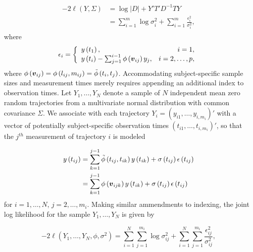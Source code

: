 \begin{align}
\begin{split} \label{eq:loglik-cholesky-form}
-2\ell\left( Y, \Sigma \right) &= \log \vert D \vert + Y' T' D^{-1} T Y \\
&= \sum_{i = 1}^m \log \sigma_i^2  + \sum_{i = 1}^m \frac {\epsilon_i^2}{\sigma_i^2},
\end{split}
\end{align}
\noindent
where 
\begin{equation} \label{eq:loglik-cholesky-form}
\epsilon_i = \left\{\begin{array}{lr}y\left(t_1\right), & i = 1, \\
y\left(t_i\right) - \sum_{j = 1}^{i-1} \phi\left(\mbox{\boldmath $v$}_{ij}\right) y_j, & i= 2, \dots, p, \\
\end{array} \right.
\end{equation}
\noindent
where $\phi\left(\mbox{\boldmath $v$}_{ij}\right) = \phi\left(l_{ij},m_{ij}\right) = \tilde{\phi}\left(t_i,t_j\right)$.  Accommodating subject-specific sample sizes and measurement times merely requires appending an additional index to observation times. Let  $Y_1, \dots, Y_N$ denote a sample of $N$ independent mean zero random trajectories from a  multivariate normal distribution with common covariance $\Sigma$. We associate with each trajectory $Y_i = \left(y_{i1}, \dots, y_{i,m_i}\right)'$ with a vector of potentially subject-specific observation times $\left(t_{i1}, \dots, t_{i,m_i}\right)'$, so that the $j^{th}$ measurement of trajectory $i$ is modeled

\begin{align}
\begin{split} \label{eq:cholesky-regression-model-2} 
y\left(t_{ij} \right)  &= \sum_{k=1}^{j-1} \tilde{\phi}\left(t_{ij} ,t_{ik}\right) y\left(t_{ik}\right) + \sigma\left(t_{ij}\right)\epsilon\left(t_{ij}\right)  \\
&= \sum_{k=1}^{j-1} \phi\left(\mbox{\boldmath $v$}_{ijk}\right) y\left(t_{ik}\right) + \sigma\left(t_{ij}\right)\epsilon\left(t_{ij}\right)
\end{split}
\end{align}
\noindent
for $i = 1,\dots, N$, $j = 2,\dots, m_i$.
\noindent
Making similar ammendments to indexing, the joint log likelihood for the sample $Y_1, \dots, Y_N$ is given by  

\begin{equation} \label{eq:joint-loglik}
-2\ell\left( Y_1,\dots, Y_N, \phi, \sigma^2 \right) = \sum_{i = 1}^N \sum_{j = 1}^{m_i} \log \sigma_{ij}^2  + \sum_{i = 1}^N \sum_{j = 1}^{m_i} \frac {\epsilon_{ij}^2}{\sigma_{ij}^2},
\end{equation}

